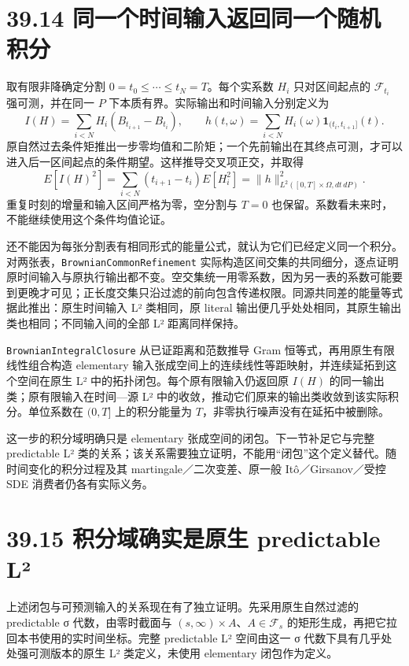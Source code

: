 \documentclass[
  11pt,
  oneside]{book}
\begin{document}
\section{39.14 同一个时间输入返回同一个随机积分}\label{ux540cux4e00ux4e2aux65f6ux95f4ux8f93ux5165ux8fd4ux56deux540cux4e00ux4e2aux968fux673aux79efux5206}

取有限非降确定分割 \(0=t_0\le\cdots\le t_N=T\)。每个实系数 \(H_i\) 只对区间起点的 \(\mathcal F_{t_i}\) 强可测，并在同一 \(P\) 下本质有界。实际输出和时间输入分别定义为 \[I(H)=\sum_{i<N}H_i(B_{t_{i+1}}-B_{t_i}),\qquad
h(t,\omega)=\sum_{i<N}H_i(\omega)\mathbf1_{(t_i,t_{i+1}]}(t).\] 原自然过去条件矩推出一步零均值和二阶矩；一个先前输出在其终点可测，才可以进入后一区间起点的条件期望。这样推导交叉项正交，并取得 \[E[I(H)^2]=\sum_{i<N}(t_{i+1}-t_i)E[H_i^2]
=\|h\|_{L^2([0,T]\times\Omega,dt\,dP)}^2.\] 重复时刻的增量和输入区间严格为零，空分割与 \(T=0\) 也保留。系数看未来时，不能继续使用这个条件均值论证。

还不能因为每张分割表有相同形式的能量公式，就认为它们已经定义同一个积分。对两张表，\nolinkurl{BrownianCommonRefinement} 实际构造区间交集的共同细分，逐点证明原时间输入与原执行输出都不变。空交集统一用零系数，因为另一表的系数可能要到更晚才可见；正长度交集只沿过滤的前向包含传递权限。同源共同差的能量等式据此推出：原生时间输入 L² 类相同，原 literal 输出便几乎处处相同，其原生输出类也相同；不同输入间的全部 L² 距离同样保持。

\nolinkurl{BrownianIntegralClosure} 从已证距离和范数推导 Gram 恒等式，再用原生有限线性组合构造 elementary 输入张成空间上的连续线性等距映射，并连续延拓到这个空间在原生 L² 中的拓扑闭包。每个原有限输入仍返回原 \(I(H)\) 的同一输出类；原有限输入在时间---源 L² 中的收敛，推动它们原来的输出类收敛到该实际积分。单位系数在 \((0,T]\) 上的积分能量为 \(T\)，非零执行噪声没有在延拓中被删除。

这一步的积分域明确只是 elementary 张成空间的闭包。下一节补足它与完整 predictable L² 类的关系；该关系需要独立证明，不能用``闭包''这个定义替代。随时间变化的积分过程及其 martingale／二次变差、原一般 Itô／Girsanov／受控 SDE 消费者仍各有实际义务。

\section{39.15 积分域确实是原生 predictable L²}\label{ux79efux5206ux57dfux786eux5b9eux662fux539fux751f-predictable-luxb2}

上述闭包与可预测输入的关系现在有了独立证明。先采用原生自然过滤的 predictable σ 代数，由零时截面与 \((s,\infty)\times A\)、\(A\in\mathcal F_s\) 的矩形生成，再把它拉回本书使用的实时间坐标。完整 predictable L² 空间由这一 σ 代数下具有几乎处处强可测版本的原生 L² 类定义，未使用 elementary 闭包作为定义。
\end{document}
